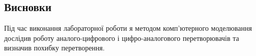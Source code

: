 \documentclass{article}
\begin{document}
\begin{normalsize}
	\section*{Висновки}
	Під час виконання лабораторної роботи я методом комп'ютерного моделювання дослідив роботу
	аналого-цифрового і цифро-аналогового перетворювачів та визначив похибку
	перетворення.
	    
\end{normalsize}
\end{document}
